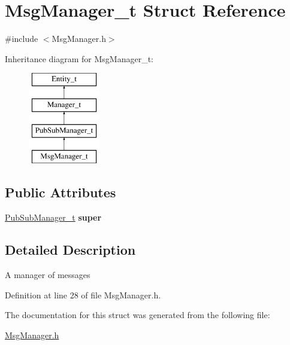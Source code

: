 \hypertarget{structMsgManager__t}{
\section{MsgManager\_\-t Struct Reference}
\label{structMsgManager__t}
}


{\ttfamily \#include $<$MsgManager.h$>$}

Inheritance diagram for MsgManager\_\-t:\begin{figure}[H]
\begin{center}
\leavevmode
\includegraphics[height=4.000000cm]{structMsgManager__t}
\end{center}
\end{figure}
\subsection*{Public Attributes}
\begin{DoxyCompactItemize}
\item 
\hypertarget{structMsgManager__t_a9bde88cff3f54cff7194c8ace1b4930c}{
\hyperlink{structPubSubManager__t}{PubSubManager\_\-t} {\bfseries super}}
\label{structMsgManager__t_a9bde88cff3f54cff7194c8ace1b4930c}

\end{DoxyCompactItemize}


\subsection{Detailed Description}
A manager of messages 

Definition at line 28 of file MsgManager.h.



The documentation for this struct was generated from the following file:\begin{DoxyCompactItemize}
\item 
\hyperlink{MsgManager_8h}{MsgManager.h}\end{DoxyCompactItemize}
